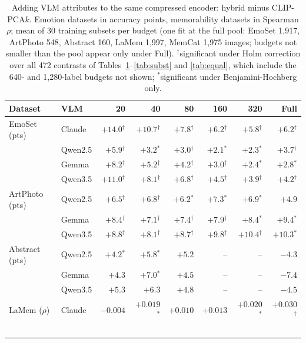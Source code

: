 \begin{table}[t]
\centering
\caption{Adding VLM attributes to the same compressed encoder: hybrid minus CLIP-PCA$k$. Emotion datasets in accuracy points, memorability datasets in Spearman $\rho$; mean of 30 training subsets per budget (one fit at the full pool: EmoSet 1,917, ArtPhoto 548, Abstract 160, LaMem 1,997, MemCat 1,975 images; budgets not smaller than the pool appear only under Full). $^{\dagger}$significant under Holm correction over all 472 contrasts of Tables~\ref{tab:added}--\ref{tab:subst} and \ref{tab:equal}, which include the 640- and 1,280-label budgets not shown; $^{*}$significant under Benjamini-Hochberg only.}
\label{tab:added}
\footnotesize
\setlength{\tabcolsep}{4pt}
\begin{tabular}{@{}llrrrrrr@{}}
\toprule
Dataset & VLM & 20 & 40 & 80 & 160 & 320 & Full \\
\midrule
EmoSet (pts) & Claude & $+14.0$$^{\dagger}$ & $+10.7$$^{\dagger}$ & $+7.8$$^{\dagger}$ & $+6.2$$^{\dagger}$ & $+5.8$$^{\dagger}$ & $+6.2$$^{\dagger}$ \\
 & Qwen2.5 & $+5.9$$^{\dagger}$ & $+3.2$$^{*}$ & $+3.0$$^{\dagger}$ & $+2.1$$^{*}$ & $+2.3$$^{*}$ & $+3.7$$^{\dagger}$ \\
 & Gemma & $+8.2$$^{\dagger}$ & $+5.2$$^{\dagger}$ & $+4.2$$^{\dagger}$ & $+3.0$$^{\dagger}$ & $+2.4$$^{*}$ & $+2.8$$^{*}$ \\
 & Qwen3.5 & $+11.0$$^{\dagger}$ & $+8.1$$^{\dagger}$ & $+6.8$$^{\dagger}$ & $+4.5$$^{\dagger}$ & $+3.9$$^{\dagger}$ & $+4.2$$^{\dagger}$ \\
\addlinespace
ArtPhoto (pts) & Qwen2.5 & $+6.5$$^{\dagger}$ & $+6.8$$^{\dagger}$ & $+6.2$$^{*}$ & $+7.3$$^{*}$ & $+6.9$$^{*}$ & $+4.9$ \\
 & Gemma & $+8.4$$^{\dagger}$ & $+7.1$$^{\dagger}$ & $+7.4$$^{\dagger}$ & $+7.9$$^{\dagger}$ & $+8.4$$^{*}$ & $+9.4$$^{*}$ \\
 & Qwen3.5 & $+8.8$$^{\dagger}$ & $+8.1$$^{\dagger}$ & $+8.7$$^{\dagger}$ & $+9.8$$^{\dagger}$ & $+10.4$$^{\dagger}$ & $+10.3$$^{*}$ \\
\addlinespace
Abstract (pts) & Qwen2.5 & $+4.2$$^{*}$ & $+5.8$$^{*}$ & $+5.2$ & -- & -- & $-4.3$ \\
 & Gemma & $+4.3$ & $+7.0$$^{*}$ & $+4.5$ & -- & -- & $-7.4$ \\
 & Qwen3.5 & $+5.3$ & $+6.3$ & $+4.8$ & -- & -- & $-4.5$ \\
\addlinespace
LaMem ($\rho$) & Claude & $-0.004$ & $+0.019$$^{*}$ & $+0.010$ & $+0.013$ & $+0.020$$^{*}$ & $+0.030$$^{\dagger}$ \\
$$
\end{tabular}
\end{table}
